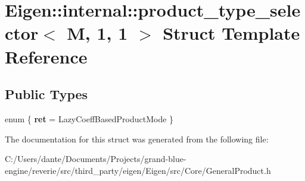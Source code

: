 \hypertarget{struct_eigen_1_1internal_1_1product__type__selector_3_01_m_00_011_00_011_01_4}{}\section{Eigen\+::internal\+::product\+\_\+type\+\_\+selector$<$ M, 1, 1 $>$ Struct Template Reference}
\label{struct_eigen_1_1internal_1_1product__type__selector_3_01_m_00_011_00_011_01_4}
\subsection*{Public Types}
\begin{DoxyCompactItemize}
\item 
\mbox{\label{struct_eigen_1_1internal_1_1product__type__selector_3_01_m_00_011_00_011_01_4_aa3ce1ff3196b494162a3dac03ce5121b}} 
enum \{ {\bfseries ret} = Lazy\+Coeff\+Based\+Product\+Mode
 \}
\end{DoxyCompactItemize}


The documentation for this struct was generated from the following file\+:\begin{DoxyCompactItemize}
\item 
C\+:/\+Users/dante/\+Documents/\+Projects/grand-\/blue-\/engine/reverie/src/third\+\_\+party/eigen/\+Eigen/src/\+Core/General\+Product.\+h\end{DoxyCompactItemize}
